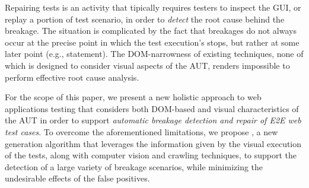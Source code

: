 Repairing tests is an activity that tipically requires testers to inspect the GUI, or replay a portion of test scenario, in order to \textit{detect} the root cause behind the breakage. The situation is complicated by the fact that breakages do not always occur at the precise point in which the test execution's stops, but rather at some later point (e.g., statement).
%
The DOM-narrowness of existing techniques, none of which is designed to consider visual aspects of the AUT, renders impossible to perform effective root cause analysis. %



For the scope of this paper, we present a new holistic approach to  web applications testing that considers both DOM-based and visual characteristics of the AUT in order to support \textit{automatic breakage detection and repair of E2E web test cases}. 
To overcome the aforementioned limitations, we propose \tool, a new generation algorithm that leverages the information given by the visual execution of the tests, along with computer vision and crawling techniques, to support the detection of a large variety of breakage scenarios, while minimizing the undesirable effects of the false positives. 

